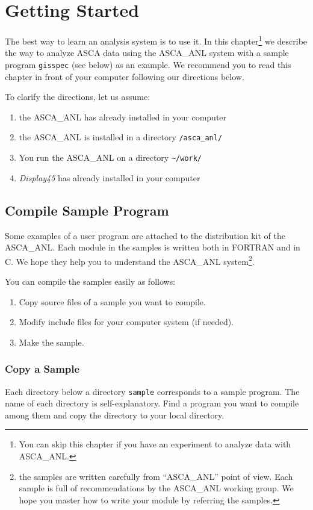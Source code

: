 \chapter{Getting Started}
The best way to learn an analysis system is to use it.
In this chapter\footnote{
You can skip this chapter
if you have an experiment to analyze data with ASCA\_ANL.
}
we describe the way to analyze ASCA data using the ASCA\_ANL system
with a sample program {\tt gisspec} (see below) as an example.
We recommend you to read this chapter in front of your computer
following our directions below.

To clarify the directions, let us assume:
\begin{enumerate}
  \item the ASCA\_ANL has already installed in your computer
  \item the ASCA\_ANL is installed in a directory {\tt /asca\_anl/}
  \item You run the ASCA\_ANL on a directory \verb|~/work/|
  \item {\em Display45} has already installed in your computer
\end{enumerate}

\section{Compile Sample Program}
Some examples of a user program
are attached to the distribution kit of the ASCA\_ANL.
Each module in the samples is written both in FORTRAN and in C.
We hope they help you to understand the ASCA\_ANL system\footnote{
the samples are written carefully from ``ASCA\_ANL'' point of view.
Each sample is full of recommendations by the ASCA\_ANL working group.
We hope you master how to write your module by referring the samples.
}.

You can compile the samples easily as follows:
\begin{enumerate}
  \item Copy source files of a sample you want to compile.
  \item Modify include files for your computer system (if needed).
  \item Make the sample.
\end{enumerate}

\subsection{Copy a Sample}
Each directory below a directory {\tt sample}
corresponds to a sample program.
The name of each directory is self-explanatory.
Find a program you want to compile among them
and copy the directory to your local directory.

